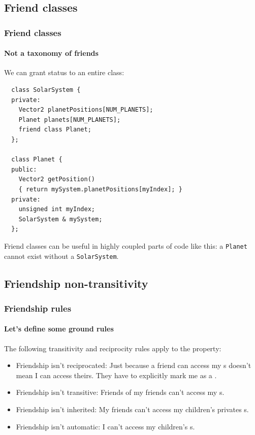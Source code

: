 \documentclass{beamer}
\begin{document}
\subsection{Friend classes}

\begin{frame}[fragile]
  \frametitle{Friend classes}
  \framesubtitle{Not a taxonomy of friends}
  
  We can grant  status to an entire class:
  \begin{lstlisting}
  class SolarSystem {
  private:
    Vector2 planetPositions[NUM_PLANETS];
    Planet planets[NUM_PLANETS];
    friend class Planet;
  };
  
  class Planet {
  public:
    Vector2 getPosition()
    { return mySystem.planetPositions[myIndex]; }
  private:
    unsigned int myIndex;
    SolarSystem & mySystem;
  };
  \end{lstlisting}
  \pause
  Friend classes can be useful in highly coupled parts of code like this: a \texttt{Planet} cannot exist without a \texttt{SolarSystem}.
  
\end{frame}

\subsection{Friendship non-transitivity}

\begin{frame}
  \frametitle{Friendship rules}
  \framesubtitle{Let's define some ground rules}
  
  The following transitivity and reciprocity rules apply to the  property:
  \begin{itemize}
  	\item<2->{Friendship isn't reciprocated: Just because a friend can access my s doesn't mean I can access theirs.  They have to explicitly mark me as a .}
    \item<3->{Friendship isn't transitive: Friends of my friends can't access my s.}
    \item<4->{Friendship isn't inherited:  My friends can't access my children's privates s.}
    \item<5->{Friendship isn't automatic: I can't access my children's s.}
  \end{itemize}

\end{frame}  
\end{document}
